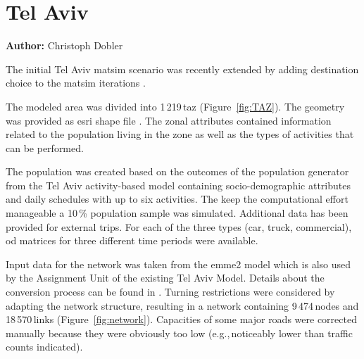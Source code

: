 \section{Tel Aviv}
\label{sec:telaviv}
\hfill \textbf{Author:} Christoph Dobler

The initial Tel Aviv \gls{matsim} scenario \citep[][]{BekhorEtAl_TRB_2011} was recently extended by adding destination choice to the \gls{matsim} iterations \citep[][]{DoblerEtAl_TechRep_IVT_2014}.

The modeled area was divided into 1\,219\,\gls{taz} (Figure~\ref{fig:TAZ}). The geometry was provided as \gls{esri} shape file \citep{ESRI-ShapeFile_manual_1998}. The zonal attributes contained information related to the population living in the zone as well as the types of activities that can be performed.

The population was created based on the outcomes of the population generator from the Tel Aviv activity-based model containing socio-demographic attributes and daily schedules with up to six activities. The keep the computational effort manageable a 10\,\% population sample was simulated. Additional data has been provided for external trips. For each of the three types (car, truck, commercial), \gls{od} matrices for three different time periods were available.

Input data for the network was taken from the \gls{emme2} model \citep[see][]{EMME_Webpage_2011} which is also used by the Assignment Unit of the existing Tel Aviv Model. Details about the conversion process can be found in \citet{GaoWEtAl_TRR_2010}. Turning restrictions were considered by adapting the network structure, resulting in a network containing 9\,474\,nodes and 18\,570\,links (Figure~\ref{fig:network}). Capacities of some major roads were corrected manually because they were obviously too low (e.g.,\,noticeably lower than traffic counts indicated).

